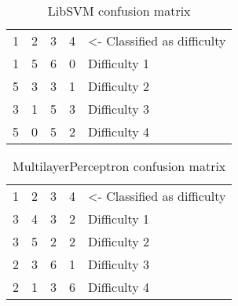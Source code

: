 \documentclass[12pt,leqno,letterpaper]{report} %
\begin{document}

\begin{table}[h]
\caption {LibSVM confusion matrix} 
\center
\begin{tabular}{ccccl}
\multicolumn{1}{l}{1} & \multicolumn{1}{l}{2} & \multicolumn{1}{l}{3} & \multicolumn{1}{l}{4} & \small{\textless- Classified as difficulty} \\ \cline{1-4}
1                          & 5                          & 6                          & \multicolumn{1}{c|}{0}     & Difficulty 1                    \\
5                          & 3                          & 3                          & \multicolumn{1}{c|}{1}     & Difficulty 2                    \\
3                          & 1                          & 5                          & \multicolumn{1}{c|}{3}     & Difficulty 3                    \\
5                          & 0                          & 5                          & \multicolumn{1}{c|}{2}     & Difficulty 4                   
\end{tabular}
\end{table}


\begin{table}[h]
\caption {MultilayerPerceptron confusion matrix} 
\center
\begin{tabular}{ccccl}
\multicolumn{1}{l}{1} & \multicolumn{1}{l}{2} & \multicolumn{1}{l}{3} & \multicolumn{1}{l}{4} & \small{\textless- Classified as difficulty} \\ \cline{1-4}
3                          & 4                          & 3                          & \multicolumn{1}{c|}{2}     & Difficulty 1                    \\
3                          & 5                          & 2                          & \multicolumn{1}{c|}{2}     & Difficulty 2                    \\
2                          & 3                          & 6                          & \multicolumn{1}{c|}{1}     & Difficulty 3                    \\
2                          & 1                          & 3                          & \multicolumn{1}{c|}{6}     & Difficulty 4                   
\end{tabular}
\end{table}
\end{document}

